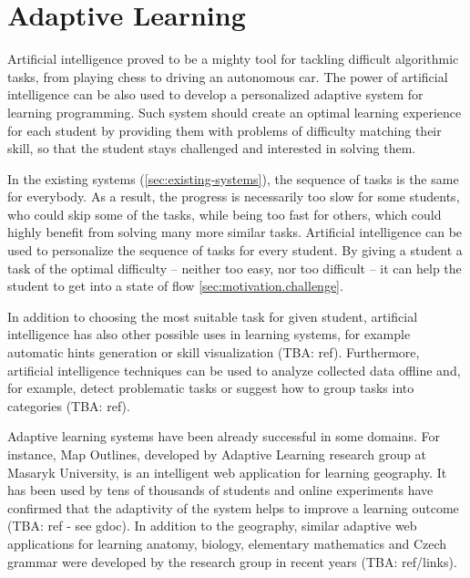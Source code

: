 \chapter{Adaptive Learning}
\label{chap:adaptive-learning}


Artificial intelligence proved to be a mighty tool
  for tackling difficult algorithmic tasks,
  from playing chess to driving an autonomous car.
The power of artificial intelligence can be also used
  to develop a personalized adaptive system for learning programming.
Such system should create an optimal learning experience for each student
  by providing them with problems of difficulty matching their skill,
  so that the student stays challenged and interested in solving them.

In the existing systems (\ref{sec:existing-systems}),
  the sequence of tasks is the same for everybody.
As a result, the progress is necessarily too slow for some students,
  who could skip some of the tasks,
  while being too fast for others,
  which could highly benefit from solving many more similar tasks.
Artificial intelligence can be used to personalize
  the sequence of tasks for every student.
By giving a student a task of the optimal difficulty
  -- neither too easy, nor too difficult --
  it can help the student to get into a state of flow
  \ref{sec:motivation.challenge}.

In addition to choosing the most suitable task for given student,
  artificial intelligence has also other possible uses in learning systems,
  for example automatic hints generation \cite{generating-hints}
  or skill visualization (TBA: ref).
Furthermore, artificial intelligence techniques can be used
  to analyze collected data offline
  and, for example, detect problematic tasks
  or suggest how to group tasks into categories (TBA: ref).

Adaptive learning systems have been already successful in some domains.
For instance, Map Outlines,
  developed by Adaptive Learning research group at Masaryk University,
  is an intelligent web application for learning geography.
It has been used by tens of thousands of students
  and online experiments have confirmed
  that the adaptivity of the system helps to improve a learning outcome
  (TBA: ref - see gdoc).
In addition to the geography, similar adaptive web applications
  for learning anatomy, biology, elementary mathematics and Czech grammar
  were developed by the research group in recent years
  (TBA: ref/links).

